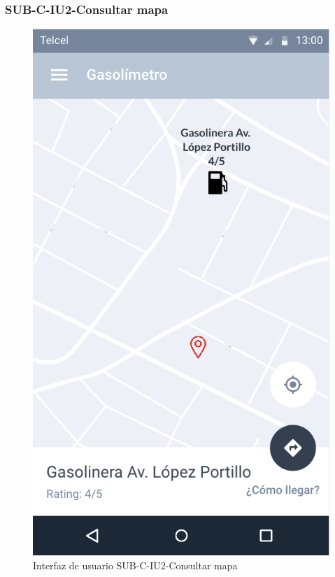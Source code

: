 \subsubsection{SUB-C-IU2-Consultar mapa}\label{SUB-C-IU2}
\begin{figure}[H]
	\centering
	\includegraphics[scale=.55]{Capitulo4/software/submodulos/clasificacion/images/sub-c-iu2}
	\caption{Interfaz de usuario SUB-C-IU2-Consultar mapa}
	\label{fig:sub-c-iu2}
\end{figure}